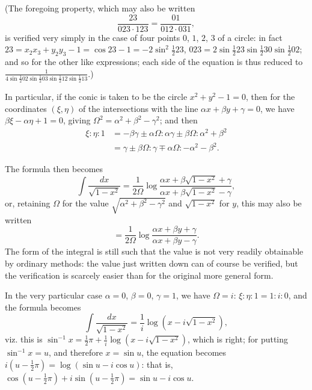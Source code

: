 \documentclass[11pt,a4paper]{book}
\begin{document}
\begin{art}\label{art:97}
(The foregoing property, which may also be written
\[
\frac{23}{023 \cdot 123} = \frac{01}{012 \cdot 031},
\]
is verified very simply in the case of four points $0$, $1$, $2$, $3$ of a circle: in fact $23 = x_2x_3 + y_2y_3 - 1 = \cos 23 - 1 = -2\sin^2 \frac{1}{2}23$, $023 = 2\sin \frac{1}{2}23 \sin \frac{1}{2}30 \sin \frac{1}{2}02$; and so for the other like expressions; each side of the equation is thus reduced to $\frac{1}{4\sin \frac{1}{2}02 \sin \frac{1}{2}03 \sin \frac{1}{2}12 \sin \frac{1}{2}13}$.)
\end{art}

\begin{art}\label{art:98}
In particular, if the conic is taken to be the circle $x^2 + y^2 - 1 = 0$, then for the coordinates $(\xi, \eta)$ of the intersections with the line $\alpha x + \beta y + \gamma = 0$, we have $\beta\xi - \alpha\eta + 1 = 0$, giving $\Omega^2 = \alpha^2 + \beta^2 - \gamma^2$; and then
\begin{align*}
\xi : \eta : 1 &= -\beta\gamma \pm \alpha\Omega : \alpha\gamma \pm \beta\Omega : \alpha^2 + \beta^2 \\
&= \gamma \pm \beta\Omega : \gamma \mp \alpha\Omega : -\alpha^2 - \beta^2.
\end{align*}

The formula then becomes
\[
\int \frac{dx}{\sqrt{1 - x^2}} = \frac{1}{2\Omega}\log\frac{\alpha x + \beta\sqrt{1 - x^2} + \gamma}{\alpha x + \beta\sqrt{1 - x^2} - \gamma},
\]
or, retaining $\Omega$ for the value $\sqrt{\alpha^2 + \beta^2 - \gamma^2}$ and $\sqrt{1 - x^2}$ for $y$, this may also be written
\[
= \frac{1}{2\Omega}\log\frac{\alpha x + \beta y + \gamma}{\alpha x + \beta y - \gamma}.
\]
The form of the integral is still such that the value is not very readily obtainable by ordinary methods: the value just written down can of course be verified, but the verification is scarcely easier than for the original more general form.
\end{art}



\newpage
In the very particular case $\alpha = 0$, $\beta = 0$, $\gamma = 1$, we have $\Omega = i$: $\xi : \eta : 1 = 1 : i : 0$, and the formula becomes
\[
\int \frac{dx}{\sqrt{1 - x^2}} = \frac{1}{i}\log(x - i\sqrt{1 - x^2}),
\]
viz. this is $\sin^{-1}x = \frac{1}{2}\pi + \frac{1}{i}\log(x - i\sqrt{1 - x^2})$, which is right; for putting $\sin^{-1}x = u$, and therefore $x = \sin u$, the equation becomes $i(u - \frac{1}{2}\pi) = \log(\sin u - i\cos u)$: that is, $\cos(u - \frac{1}{2}\pi) + i\sin(u - \frac{1}{2}\pi) = \sin u - i\cos u$.
\end{document}
